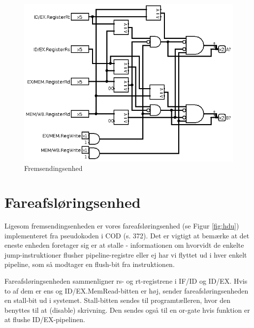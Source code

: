 \documentclass[10pt,a4paper,danish]{article}
\begin{document}
\begin{figure}[htb]
\begin{center}
\leavevmode
\includegraphics[scale=0.50]{forwarding_unit.png}
\end{center}
\caption{Fremsendingsenhed}
\label{fig:fu}
\end{figure}

\section{Fareafsløringsenhed}
Ligesom fremsendingsenheden er vores fareafsløringsenhed (se Figur \ref{fig:hdu})
implementeret fra pseudokoden i COD (s. 372). Det er vigtigt at bemærke at 
det eneste enheden foretager sig er at stalle - informationen om hvorvidt de 
enkelte jump-instruktioner flusher pipeline-registre eller ej har vi flyttet
ud i hver enkelt pipeline, som så modtager en flush-bit fra instruktionen. 

Fareafsløringsenheden sammenligner rs- og rt-registrene i IF/ID og ID/EX. Hvis
to af dem er ens og ID/EX.MemRead-bitten er høj, sender fareafsløringsenheden
en stall-bit ud i systemet. Stall-bitten sendes til programtælleren, hvor den 
benyttes til at (disable) skrivning. Den sendes også til en or-gate hvis 
funktion er at flushe ID/EX-pipelinen. 
\end{document}
